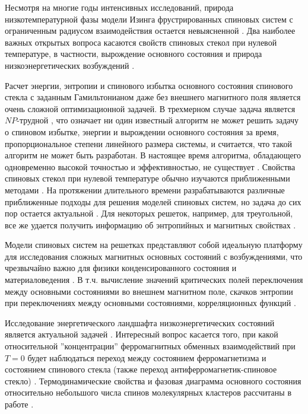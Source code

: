 \documentclass[utf8, babel, sor, jor, amsmath, amssymb, reprint]{elsarticle} %
\begin{document}
Несмотря на многие годы интенсивных исследований, природа низкотемпературной фазы модели Изинга фрустрированных спиновых систем с ограниченным радиусом взаимодействия остается невыясненной \cite{roma2010ground, newman2023proof}. Два наиболее важных открытых вопроса касаются свойств спиновых стекол при нулевой температуре, в частности, вырождение основного состояния и природа низкоэнергетических возбуждений \cite{newman2022ground}.  

Расчет энергии, энтропии и спинового избытка основного состояния спинового стекла с заданным Гамильтонианом даже без внешнего магнитного поля является очень сложной оптимизационной задачей. В трехмерном случае задача является $NP$-трудной \cite{barahona1982computational, hartmann2002optimization}, что означает ни один известный алгоритм не может решить задачу о спиновом избытке, энергии и вырождении основного состояния за время, пропорциональное степени линейного размера системы, и считается, что такой алгоритм не может быть разработан. В настоящее время алгоритма, обладающего одновременно высокой точностью и эффективностью, не существует \cite{fan2023searching}. Свойства спиновых стекол при нулевой температуре обычно изучаются приближенными методами \cite{roma2009ground, perez2012ground}. На протяжении длительного времени разрабатываются различные приближенные подходы для решения моделей спиновых систем, но задача до сих пор остается актуальной \cite{ rybin2022hybrid, makarova2023canonical,farias2024differentiable}.  Для некоторых решеток, например, для треугольной, все же удается получить информацию об энтропийных и магнитных свойствах \cite{jurvcivsinova2024classical}.

Модели спиновых систем на решетках представляют собой идеальную платформу для исследования сложных магнитных основных состояний с возбуждениями, что чрезвычайно важно для физики конденсированного состояния и материаловедения \cite{lacroix2011introduction}. В т.ч. вычисление значений критических полей переключения между основными состояниями во внешнем магнитном поле, скачков энтропии при переключениях между основными состояниями, корреляционных функций \cite{ramirez2004effect, rosas2004random, andriushchenko2019large}. 

Исследование энергетического ландшафта низкоэнергетических состояний является актуальной задачей \cite{biswas2023energy}. Интересный вопрос касается того, при какой относительной ''концентрации''  ферромагнитных обменных взаимодействий при $T=0$ будет наблюдаться переход между состоянием ферро\-маг\-не\-тиз\-ма и состоянием спинового стекла (также переход анти\-ферро\-маг\-не\-тик-спиновое стекло) \cite{zimmer2022role}. Термодинамические свойства и фазовая диаграмма основного состояния относительно небольшого числа спинов молекулярных кластеров рассчитаны в работе \cite{dias2023ground}.
\end{document}
